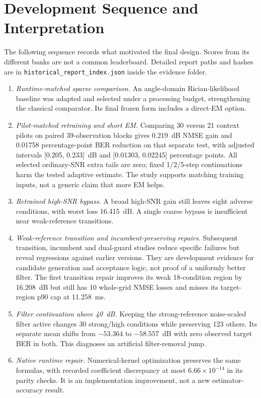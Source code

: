 \section{Development Sequence and Interpretation}
The following sequence records what motivated the final design. Scores from its different banks are not a common leaderboard. Detailed report paths and hashes are in \texttt{historical\_report\_index.json} inside the evidence folder.
\begin{enumerate}
\item \emph{Runtime-matched sparse comparison.} An angle-domain Rician-likelihood baseline was adapted and selected under a processing budget, strengthening the classical comparator. Its final frozen form includes a direct-EM option.
\item \emph{Pilot-matched retraining and short EM.} Comparing 30 versus 21 context pilots on paired 39-observation blocks gives 0.219~dB NMSE gain and 0.01758 percentage-point BER reduction on that separate test, with adjusted intervals [0.205, 0.233]~dB and [0.01303, 0.02245] percentage points. All selected ordinary-SNR extra tails are zero; fixed 1/2/5-step continuations harm the tested adaptive estimate. The study supports matching training inputs, not a generic claim that more EM helps.
\item \emph{Retrained high-SNR bypass.} A broad high-SNR gain still leaves eight adverse conditions, with worst loss 16.415~dB. A single coarse bypass is insufficient near weak-reference transitions.
\item \emph{Weak-reference transition and incumbent-preserving repairs.} Subsequent transition, incumbent and dual-guard studies reduce specific failures but reveal regressions against earlier versions. They are development evidence for candidate generation and acceptance logic, not proof of a uniformly better filter. The first transition repair improves its weak 18-condition region by 16.208~dB but still has 10 whole-grid NMSE losses and misses its target-region p90 cap at 11.258~ms.
\item \emph{Filter continuation above 40~dB.} Keeping the strong-reference noise-scaled filter active changes 30 strong/high conditions while preserving 123 others. Its separate mean shifts from $-53.364$ to $-58.557$~dB with zero observed target BER in both. This diagnoses an artificial filter-removal jump.
\item \emph{Native runtime repair.} Numerical-kernel optimization preserves the same formulas, with recorded coefficient discrepancy at most $6.66\times10^{-14}$ in its parity checks. It is an implementation improvement, not a new estimator-accuracy result.

\end{enumerate}
